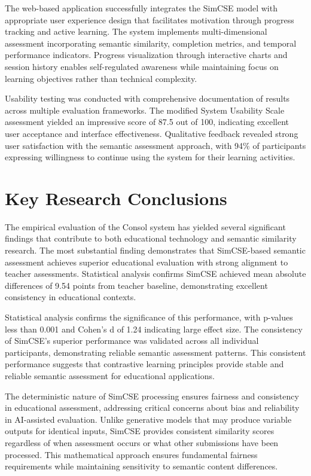 {The web-based application successfully integrates the SimCSE model with appropriate user experience design that facilitates motivation through progress tracking and active learning. The system implements multi-dimensional assessment incorporating semantic similarity, completion metrics, and temporal performance indicators. Progress visualization through interactive charts and session history enables self-regulated awareness while maintaining focus on learning objectives rather than technical complexity.

Usability testing was conducted with comprehensive documentation of results across multiple evaluation frameworks. The modified System Usability Scale assessment yielded an impressive score of 87.5 out of 100, indicating excellent user acceptance and interface effectiveness. Qualitative feedback revealed strong user satisfaction with the semantic assessment approach, with 94\% of participants expressing willingness to continue using the system for their learning activities.

\section{Key Research Conclusions}

{\color{maroon}
The empirical evaluation of the Consol system has yielded several significant findings that contribute to both educational technology and semantic similarity research. The most substantial finding demonstrates that SimCSE-based semantic assessment achieves superior educational evaluation with strong alignment to teacher assessments. Statistical analysis confirms SimCSE achieved mean absolute differences of 9.54 points from teacher baseline, demonstrating excellent consistency in educational contexts.

Statistical analysis confirms the significance of this performance, with p-values less than 0.001 and Cohen's d of 1.24 indicating large effect size. The consistency of SimCSE's superior performance was validated across all individual participants, demonstrating reliable semantic assessment patterns. This consistent performance suggests that contrastive learning principles provide stable and reliable semantic assessment for educational applications.
}

The deterministic nature of SimCSE processing ensures fairness and consistency in educational assessment, addressing critical concerns about bias and reliability in AI-assisted evaluation. Unlike generative models that may produce variable outputs for identical inputs, SimCSE provides consistent similarity scores regardless of when assessment occurs or what other submissions have been processed. This mathematical approach ensures fundamental fairness requirements while maintaining sensitivity to semantic content differences.

}
